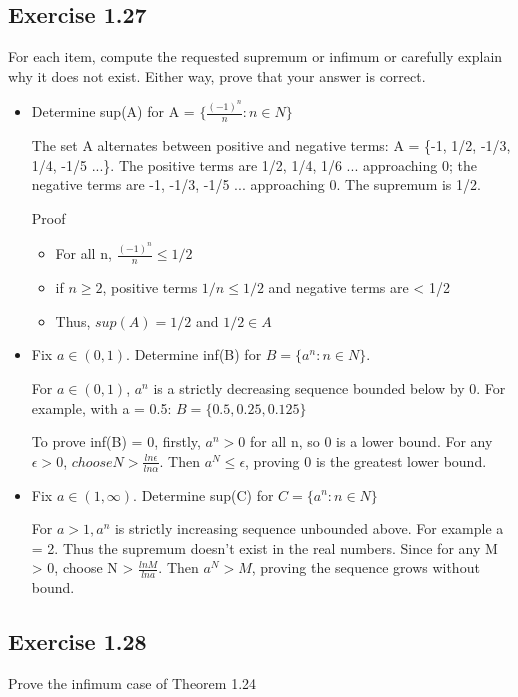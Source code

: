 \documentclass[12pt]{article}
\begin{document}
		\subsection*{Exercise 1.27}
			For each item, compute the requested supremum or infimum or carefully explain why it does not exist. Either way, prove that your answer is correct.
			\begin{itemize}
				\item Determine sup(A) for A = $\{\frac{(-1)^n}{n}:n \in N\}$
				
					The set A alternates between positive and negative terms: A = \{-1, 1/2, -1/3, 1/4, -1/5 ...\}. The positive terms are 1/2, 1/4, 1/6 ... approaching 0; the negative terms are -1, -1/3, -1/5 ... approaching 0. The supremum is 1/2. 
					
					Proof
					\begin{itemize}
						\item For all n, $\frac{(-1)^n}{n} \le 1/2$
						\item if $n \ge 2$, positive terms $1/n \le 1/2$ and negative terms are < 1/2
						\item Thus, $sup(A) = 1/2$ and $1/2 \in A$
					\end{itemize}
				
				\item Fix $a \in (0,1)$. Determine inf(B) for $B = \{a^n:n \in N\}$.
				
				For $a \in (0,1)$, $a^n$ is a strictly decreasing sequence bounded below by 0. For example, with a = 0.5: $B = \{0.5, 0.25, 0.125\}$
				
				To prove inf(B) = 0, firstly, $a^n > 0$ for all n, so 0 is a lower bound. For any $\epsilon > 0$, $choose N > \frac{ln \epsilon}{ln \alpha}$. Then $a^N \le \epsilon$, proving 0 is the greatest lower bound.
				
				\item Fix $a \in (1, \infty)$. Determine sup(C) for $C = \{a^n: n \in N\}$
				
				For $a > 1, a^n$ is strictly increasing sequence unbounded above. For example a = 2. Thus the supremum doesn't exist in the real numbers. Since for any M > 0, choose N > $\frac{ln M}{ln a}$. Then $a^N > M$, proving the sequence grows without bound.
			\end{itemize}
		\subsection*{Exercise 1.28}
			Prove the infimum case of Theorem 1.24
			
\end{document}
